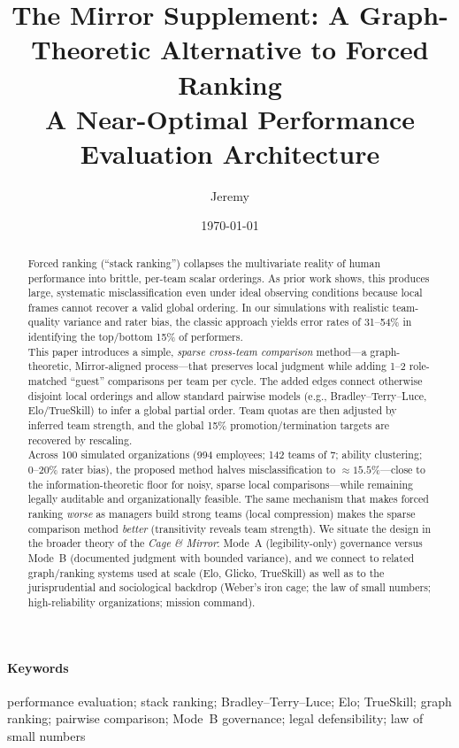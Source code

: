 \documentclass[11pt]{article}
\title{\bf The Mirror Supplement: A Graph-Theoretic Alternative to Forced Ranking\\
\large A Near-Optimal Performance Evaluation Architecture}
\author{Jeremy}
\date{\today}
\begin{document}
\maketitle

\begin{abstract}
Forced ranking (``stack ranking'') collapses the multivariate reality of human performance into brittle, per-team scalar orderings. As prior work shows, this produces large, systematic misclassification even under ideal observing conditions because local frames cannot recover a valid global ordering. In our simulations with realistic team-quality variance and rater bias, the classic approach yields error rates of 31--54\% in identifying the top/bottom 15\% of performers.\\[4pt]
\noindent
This paper introduces a simple, \emph{sparse cross-team comparison} method---a graph-theoretic, Mirror-aligned process---that preserves local judgment while adding 1--2 role-matched ``guest'' comparisons per team per cycle. The added edges connect otherwise disjoint local orderings and allow standard pairwise models (e.g., Bradley--Terry--Luce, Elo/TrueSkill) to infer a global partial order. Team quotas are then adjusted by inferred team strength, and the global 15\% promotion/termination targets are recovered by rescaling.\\[4pt]
\noindent
Across 100 simulated organizations (994 employees; 142 teams of 7; ability clustering; 0--20\% rater bias), the proposed method halves misclassification to $\approx 15.5\%$---close to the information-theoretic floor for noisy, sparse local comparisons---while remaining legally auditable and organizationally feasible. The same mechanism that makes forced ranking \emph{worse} as managers build strong teams (local compression) makes the sparse comparison method \emph{better} (transitivity reveals team strength). We situate the design in the broader theory of the \emph{Cage \& Mirror}: Mode~A (legibility-only) governance versus Mode~B (documented judgment with bounded variance), and we connect to related graph/ranking systems used at scale (Elo, Glicko, TrueSkill) as well as to the jurisprudential and sociological backdrop (Weber's iron cage; the law of small numbers; high-reliability organizations; mission command).
\end{abstract}

\paragraph{Keywords} performance evaluation; stack ranking; Bradley--Terry--Luce; Elo; TrueSkill; graph ranking; pairwise comparison; Mode~B governance; legal defensibility; law of small numbers
\end{document}
